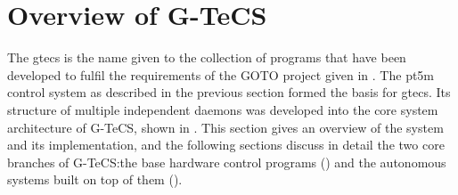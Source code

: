\begin{colsection}
\begin{colsection}
\end{colsection}


\end{colsection}


\newpage
\section{Overview of G-TeCS}
\label{sec:gtecs}
\begin{colsection}


\begin{colsection}

The \gls{gtecs} is the name given to the collection of programs that have been developed to fulfil the requirements of the GOTO project given in . The \gls{pt5m} control system as described in the previous section formed the basis for \gls{gtecs}. Its structure of multiple independent daemons was developed into the core system architecture of G-TeCS, shown in . This section gives an overview of the system and its implementation, and the following sections discuss in detail the two core branches of G-TeCS:\@ the base hardware control programs () and the autonomous systems built on top of them ().



\end{colsection}
\end{colsection}
